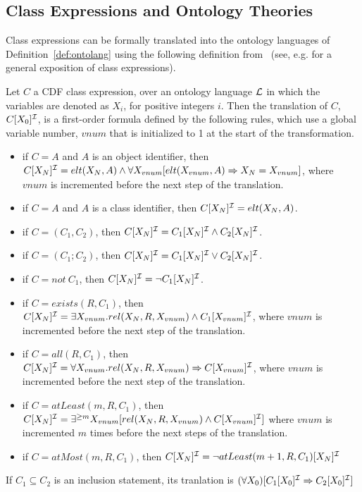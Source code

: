 \subsection{Class Expressions and Ontology Theories} \label{sec:cesemantics}

Class expressions can be formally translated into the ontology
languages of Definition~\ref{def:ontolang} using the following
definition from~\cite{Swif04} (see, e.g. \cite{CGLN02} for a general
exposition of class expressions).

\begin{definition} \label{def:fot}
Let $C$ a CDF class expression, over an ontology language ${\cal L}$ in
which the variables are denoted as $X_i$, for positive integers $i$.
Then the translation of $C$, $C[X_0]^{{\cal I}}$, is a first-order formula
defined by the following rules, which use a global variable number,
$vnum$ that is initialized to 1 at the start of the transformation.

\begin{itemize}
\item if $C = A$ and  $A$ is an object identifier, then  $C[X_N]^{{\cal I}} =
  elt(X_N,A) \wedge \forall X_{vnum} [elt(X_{vnum},A) \Rightarrow X_N = X_{vnum}]$, 
	where $vnum$ is incremented before the next step of the translation.
%
\item if $C = A$ and  $A$ is a class identifier, then  $C[X_N]^{{\cal I}} =
		elt(X_N,A)$.
%
%
\item if $C = (C_1 , C_2)$, then $C[X_N]^{{\cal I}} =
		C_1[X_N]^{{\cal I}} \wedge C_2[X_N]^{{\cal I}}$.
%
\item if $C = (C_1 ; C_2)$, then $C[X_N]^{{\cal I}} =
		C_1[X_N]^{{\cal I}} \vee C_2[X_N]^{{\cal I}}$.
%
\item if $C = not\ C_1$, then $C[X_N]^{{\cal I}} = \neg C_1[X_N]^{{\cal I}}$.
%
\item if $C = exists(R,C_1)$, then $C[X_N]^{{\cal I}} =
		\exists X_{vnum}. rel(X_N,R,X_{vnum}) \wedge
		C_1[X_{vnum}]^{{\cal I}}$, where $vnum$ is
			incremented before the	next step of the translation.
%
\item if $C = all(R,C_1)$, then $C[X_N]^{{\cal I}} = 
	\forall X_{vnum}. rel(X_N,R,X_{vnum}) \Rightarrow C[X_{vnum}]^{{\cal I}}$,
	where $vnum$ is incremented before the next step of the translation.
%

\item if $C = atLeast(m,R,C_1)$, then $C[X_N]^{{\cal I}} = 
\exists^{\geq m} X_{vnum} [rel(X_N,R,X_{vnum}) \wedge C[X_{vnum}]^{{\cal I}}]
$		
where $vnum$ is incremented $m$ times before the next steps of the
translation. 
%
\item if $C  = atMost(m,R,C_1)$, then 
	$C[X_N]^{{\cal I}} = \neg atLeast(m+1,R,C_1)[X_N]^{{\cal I}}$

\end{itemize}
If $C_1 \subseteq C_2$ is an inclusion statement, its tranlation is 
$
(\forall X_0) [ C_1[X_0]^{{\cal I}} \Rightarrow C_2[X_0]^{{\cal I}} ]
$
\end{definition}

